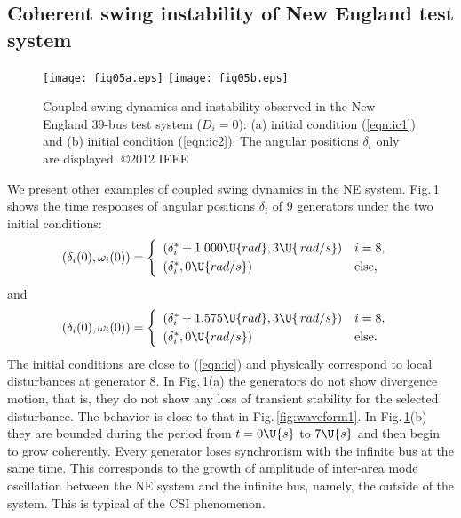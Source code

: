 \documentclass[a4paper,10pt]{article}
\begin{document}
\subsection{Coherent swing instability of New England test system}
\label{subsec:precursor-CSI}

\begin{figure}[t] %
\centering
\texttt{[image: fig05a.eps]}
\texttt{[image: fig05b.eps]}
\caption{%
Coupled swing dynamics and instability observed in the New England 39-bus test system ($D_i=0$):  (a) initial condition (\ref{eqn:ic1}) and (b) initial condition (\ref{eqn:ic2}).  
The angular positions $\delta_i$ only are displayed.  
\copyright 2012 IEEE
}%
\label{fig:waveform2}
\end{figure}

%
We present other examples of coupled swing dynamics in the NE system.  
Fig.\,\ref{fig:waveform2} shows the time responses of angular positions $\delta_i$ of 9 generators under the two initial conditions:  
\begin{equation}
\makebox[-0.5em]{}(\delta_i(0),\omega_i(0))=
\left\{
\begin{array}{ll}
(\delta^\ast_i+1.000\U{rad},3\U{\,rad/s}) & i=8,
\\\noalign{\vskip +1.0mm}
(\delta^\ast_i,0\U{rad/s}) & \mathrm{else,}
\end{array}
\right.
\label{eqn:ic1}
\end{equation}
and
\begin{equation}
\makebox[-0.5em]{}(\delta_i(0),\omega_i(0))=
\left\{
\begin{array}{ll}
(\delta^\ast_i+1.575\U{rad},3\U{\,rad/s}) & i=8,
\\\noalign{\vskip +1.0mm}
(\delta^\ast_i,0\U{rad/s}) & \mathrm{else.}
\end{array}
\right.
\label{eqn:ic2}
\end{equation}
The initial conditions are close to (\ref{eqn:ic}) and physically correspond to local disturbances at generator 8.  
In Fig.\,\ref{fig:waveform2}(a) the generators do not show divergence motion, that is, they do not show any loss of transient stability for the selected disturbance.    
The behavior is close to that in Fig.\,\ref{fig:waveform1}.  
In Fig.\,\ref{fig:waveform2}(b) they are bounded during the period from $t=0\U{s}$ to $7\U{s}$ and then begin to grow coherently.  
Every generator loses synchronism with the infinite bus at the same time.  
This corresponds to the growth of amplitude of inter-area mode oscillation between the NE system and the infinite bus, namely, the outside of the system.  
This is typical of the CSI phenomenon.   
\end{document}
